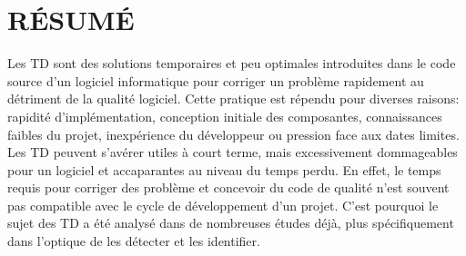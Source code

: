 %
%


\chapter*{RÉSUMÉ}\thispagestyle{headings}

\setlength{\parindent}{5ex} Les \ac{TD} sont des solutions temporaires et peu optimales introduites dans le code source d'un logiciel informatique pour corriger un probl\`{e}me rapidement au d\'{e}triment de la qualit\'{e} logiciel. Cette pratique est r\'{e}pendu pour diverses raisons: rapidit\'{e} d'impl\'{e}mentation, conception initiale des composantes, connaissances faibles du projet, inexp\'{e}rience du d\'{e}veloppeur ou pression face aux dates limites. Les \ac{TD} peuvent s'av\'{e}rer utiles \`{a} court terme, mais excessivement dommageables pour un logiciel et accaparantes au niveau du temps perdu. En effet, le temps requis pour corriger des probl\`{e}me et concevoir du code de qualit\'{e} n'est souvent pas compatible avec le cycle de d\'{e}veloppement d'un projet. C'est pourquoi le sujet des \ac{TD} a \'{e}t\'{e} analys\'{e} dans de nombreuses \'{e}tudes d\'{e}j\`{a}, plus sp\'{e}cifiquement dans l'optique de les d\'{e}tecter et les identifier. \par

